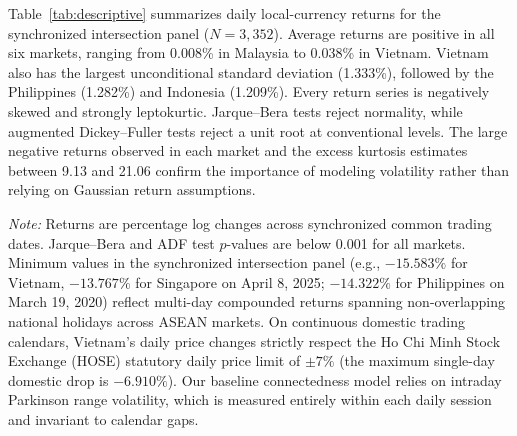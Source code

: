 \documentclass[12pt,a4paper]{article}
\begin{document}
Table~\ref{tab:descriptive} summarizes daily local-currency returns for the synchronized intersection panel ($N=3,352$). Average returns are positive in all six markets, ranging from 0.008\% in Malaysia to 0.038\% in Vietnam. Vietnam also has the largest unconditional standard deviation (1.333\%), followed by the Philippines (1.282\%) and Indonesia (1.209\%). Every return series is negatively skewed and strongly leptokurtic. Jarque--Bera tests reject normality, while augmented Dickey--Fuller tests reject a unit root at conventional levels. The large negative returns observed in each market and the excess kurtosis estimates between 9.13 and 21.06 confirm the importance of modeling volatility rather than relying on Gaussian return assumptions.

\begin{table}[H]
\centering
\caption{Descriptive statistics for daily local-currency returns}
\label{tab:descriptive}
\begin{minipage}{0.95\textwidth}
\footnotesize\textit{Note:} Returns are percentage log changes across synchronized common trading dates. Jarque--Bera and ADF test $p$-values are below 0.001 for all markets. Minimum values in the synchronized intersection panel (e.g., $-15.583\%$ for Vietnam, $-13.767\%$ for Singapore on April 8, 2025; $-14.322\%$ for Philippines on March 19, 2020) reflect multi-day compounded returns spanning non-overlapping national holidays across ASEAN markets. On continuous domestic trading calendars, Vietnam's daily price changes strictly respect the Ho Chi Minh Stock Exchange (HOSE) statutory daily price limit of $\pm 7\%$ (the maximum single-day domestic drop is $-6.910\%$). Our baseline connectedness model relies on intraday Parkinson range volatility, which is measured entirely within each daily session and invariant to calendar gaps.
\end{minipage}
\end{table}
\end{document}
